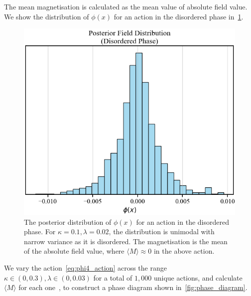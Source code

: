 \documentclass[11pt]{article}
\begin{document}
    The mean magnetisation is calculated as the mean value of absolute field value.
    We show the distribution of $\phi(x)$ for an action in the disordered phase in~\cref{fig:magnetisation}.
\begin{figure}[h!]
    \center
    \includegraphics[width=\linewidth]{../figures/Magnetisation}
    \caption{
        The posterior distribution of $\phi(x)$ for an action in the disordered phase.
        For $\kappa = 0.1, \lambda = 0.02$, the distribution is unimodal with narrow variance as it is disordered.
        The magnetisation is the mean of the absolute field value, where $\langle M \rangle \approx 0$ in the above
        action.
    }\label{fig:magnetisation}
    \end{figure}

    We vary the action~\eqref{eq:phi4_action} across the range $\kappa \in (0, 0.3), \lambda \in (0, 0.03)$ for
    a total of $1,000$ unique actions, and calculate $\langle M \rangle$ for each one~\cite{anesthetic}, to construct a phase diagram
    shown in~\cref{fig:phase_diagram}.
\end{document}
